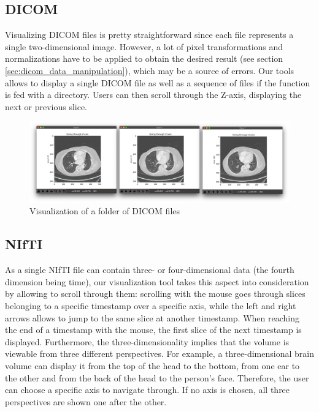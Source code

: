 \subsection{DICOM}
\setlength{\marginparwidth}{3cm}\leavevmode {}Visualizing DICOM files is pretty straightforward since each file represents a single two-dimensional image. However, a lot of pixel transformations and normalizations have to be applied to obtain the desired result (see section \ref{sec:dicom_data_manipulation}), which may be a source of errors. Our tools allows to display a single DICOM file as well as a sequence of files if the function is fed with a directory. Users can then scroll through the Z-axis, displaying the next or previous slice. 

\begin{figure}[!h]
\centering
\includegraphics[width=\textwidth, keepaspectratio=true]{./figures/visualize_lung_dcm.png}
\caption{Visualization of a folder of DICOM files}
\label{fig:visualize_lung_dcm}
\end{figure}


\subsection{NIfTI}
\setlength{\marginparwidth}{3cm}\leavevmode {}As a single NIfTI file can contain three- or four-dimensional data (the fourth dimension being time), our visualization tool takes this aspect into consideration by allowing to scroll through them: scrolling with the mouse goes through slices belonging to a specific timestamp over a specific axis, while the left and right arrows allows to jump to the same slice at another timestamp. When reaching the end of a timestamp with the mouse, the first slice of the next timestamp is displayed. Furthermore, the three-dimensionality implies that the volume is viewable from three different perspectives. For example, a three-dimensional brain volume can display it from the top of the head to the bottom, from one ear to the other and from the back of the head to the person's face. Therefore, the user can choose a specific axis to navigate through. If no axis is chosen, all three perspectives are shown one after the other.

